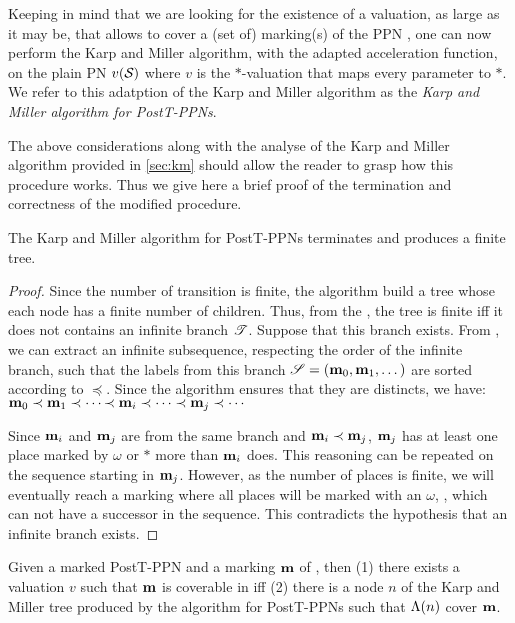 Keeping in mind that we are looking for the existence of a valuation, as large as it may be, that allows to cover a (set of) marking(s) of the \ac{PPN} \namePPN, one can now perform the Karp and Miller algorithm, with the adapted acceleration function, on the plain \ac{PN} $v(\mathcal{S}_{{}})$ where $v$ is the $*$-valuation that maps every parameter to $*$.
We refer to this adatption of the Karp and Miller algorithm as the \emph{Karp and Miller algorithm for PostT-PPNs}.

The above considerations along with the analyse of the Karp and Miller algorithm provided in \cref{sec:km} should allow the reader to grasp how this procedure works.
Thus we give here a brief proof of the termination and correctness of the modified procedure.

\begin{theo}
  \label{theo:km-ecov-postt-ppn-termination}
  The Karp and Miller algorithm for PostT-PPNs
  terminates and produces a finite tree.
\end{theo}

\begin{proof}
  Since the number of transition is finite, the algorithm build a tree whose each node has a finite number of children.
  Thus, from the , the tree is finite iff it does not contains an infinite branch $\mathscr{T}$. 
  Suppose that this branch exists.
  From , we can extract an infinite subsequence, respecting the order of the infinite branch, such that the labels from this branch $\defInfSeq[\seq][\mar][0][1]$ are sorted according to $\preceq$.
  Since the algorithm ensures that they are distincts, we have:
  \( \elemsInfSeq[\mar][0][1][\prec \mar_i \prec \dotsb \prec \mar_j \prec \dotsb][\prec][\dotsb] \)
  
  Since $\mathbf{m}_i$ and $\mathbf{m}_j$ are from the same branch and $\mathbf{m}_i \prec \mathbf{m}_j$, $\mathbf{m}_j$ has at least one place marked by $\omega$ or $*$ more than $\mathbf{m}_i$ does.
  This reasoning can be repeated on the sequence starting in $\mathbf{m}_j$.
  However, as the number of places is finite, we will eventually reach a marking where all places will be marked with an $\omega$, , which can not have a successor in the sequence.
  This contradicts the hypothesis that an infinite branch exists.
\end{proof}

\begin{theo}
  \label{theo:km-ecov-postt-ppn-correctness}
  Given a marked PostT-PPN \namePPN and a marking $\mathbf{m}$ of \namePPN,
    then \qquad (1)
    there exists a valuation $v$ such that $\mathbf{m}$ is coverable in \namePPN
    \qquad iff \qquad (2)
    there is a node $n$ of the Karp and Miller tree produced by the algorithm for PostT-PPNs
      such that $\operatorname{\Lambda}(n)$ cover $\mathbf{m}$.
\end{theo}

